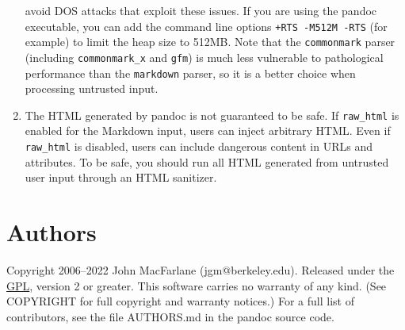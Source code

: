 \documentclass[
]{article}
\begin{document}
\begin{enumerate}
  avoid DOS attacks that exploit these issues. If you are using the
  pandoc executable, you can add the command line options
  \texttt{+RTS\ -M512M\ -RTS} (for example) to limit the heap size to
  512MB. Note that the \texttt{commonmark} parser (including
  \texttt{commonmark\_x} and \texttt{gfm}) is much less vulnerable to
  pathological performance than the \texttt{markdown} parser, so it is a
  better choice when processing untrusted input.
\item
  The HTML generated by pandoc is not guaranteed to be safe. If
  \texttt{raw\_html} is enabled for the Markdown input, users can inject
  arbitrary HTML. Even if \texttt{raw\_html} is disabled, users can
  include dangerous content in URLs and attributes. To be safe, you
  should run all HTML generated from untrusted user input through an
  HTML sanitizer.
\end{enumerate}

\section{Authors}\label{authors}

Copyright 2006--2022 John MacFarlane (jgm@berkeley.edu). Released under
the \href{https://www.gnu.org/copyleft/gpl.html}{GPL}, version 2 or
greater. This software carries no warranty of any kind. (See COPYRIGHT
for full copyright and warranty notices.) For a full list of
contributors, see the file AUTHORS.md in the pandoc source code.
\end{document}
